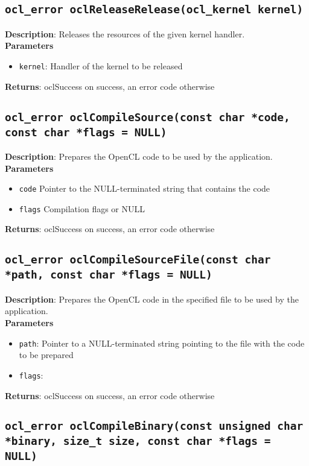 \subsection{\texttt{ocl\_error oclReleaseRelease(ocl\_kernel kernel)}}

\textbf{Description}: Releases the resources of the given kernel handler. \\
\textbf{Parameters}
\begin{itemize}
  \item \texttt{kernel}: Handler of the kernel to be released
\end{itemize}
\textbf{Returns}: oclSuccess on success, an error code otherwise


\subsection{\texttt{ocl\_error oclCompileSource(const char *code, const char *flags = NULL)}}

\textbf{Description}: Prepares the OpenCL code to be used by the application. \\
\textbf{Parameters}
\begin{itemize}
  \item \texttt{code} Pointer to the NULL\hyp{}terminated string that contains the code
  \item \texttt{flags} Compilation flags or NULL
\end{itemize}
\textbf{Returns}: oclSuccess on success, an error code otherwise

\subsection{\texttt{ocl\_error oclCompileSourceFile(const char *path, const char *flags = NULL)}}

\textbf{Description}: Prepares the OpenCL code in the specified file to be used by the application.  \\
\textbf{Parameters}
\begin{itemize}
  \item \texttt{path}: Pointer to a NULL\hyp{}terminated string pointing to the file with the code 
 to be prepared
  \item \texttt{flags}: \end{itemize}
\textbf{Returns}: oclSuccess on success, an error code otherwise

\subsection{\texttt{ocl\_error oclCompileBinary(const unsigned char *binary, size\_t size, const char *flags = NULL)}}

